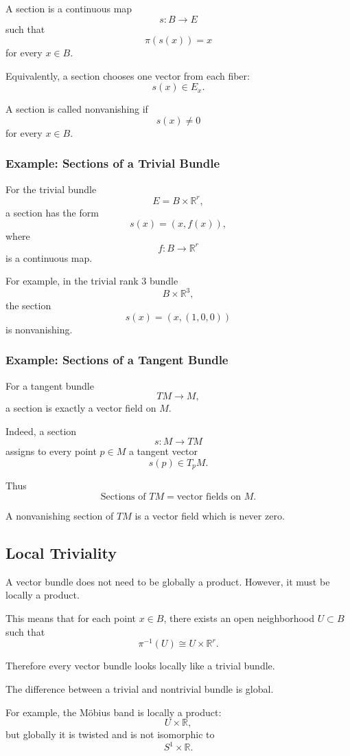 \documentclass[12pt,a4paper]{article}
\theoremstyle{notespace}
\begin{document}
A section is a continuous map
\[
s:B\to E
\]
such that
\[
\pi(s(x))=x
\]
for every \(x\in B\).

Equivalently, a section chooses one vector from each fiber:
\[
s(x)\in E_x.
\]

A section is called nonvanishing if
\[
s(x)\neq 0
\]
for every \(x\in B\).

\subsubsection{Example: Sections of a Trivial Bundle}

For the trivial bundle
\[
E=B\times \mathbb R^r,
\]
a section has the form
\[
s(x)=(x,f(x)),
\]
where
\[
f:B\to \mathbb R^r
\]
is a continuous map.

For example, in the trivial rank \(3\) bundle
\[
B\times \mathbb R^3,
\]
the section
\[
s(x)=(x,(1,0,0))
\]
is nonvanishing.

\subsubsection{Example: Sections of a Tangent Bundle}

For a tangent bundle
\[
TM\to M,
\]
a section is exactly a vector field on \(M\).

Indeed, a section
\[
s:M\to TM
\]
assigns to every point \(p\in M\) a tangent vector
\[
s(p)\in T_pM.
\]

Thus
\[
\boxed{
	\text{Sections of }TM
	=
	\text{vector fields on }M.
}
\]

A nonvanishing section of \(TM\) is a vector field which is never zero.

\subsection{Local Triviality}

A vector bundle does not need to be globally a product. However, it must be locally a product.

This means that for each point \(x\in B\), there exists an open neighborhood \(U\subset B\) such that
\[
\pi^{-1}(U)\cong U\times \mathbb R^r.
\]

Therefore every vector bundle looks locally like a trivial bundle.

The difference between a trivial and nontrivial bundle is global.

For example, the Möbius band is locally a product:
\[
U\times \mathbb R,
\]
but globally it is twisted and is not isomorphic to
\[
S^1\times \mathbb R.
\]
\end{document}
